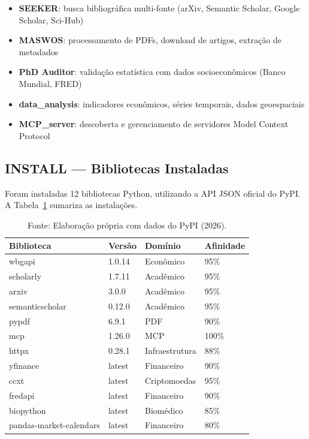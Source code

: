\documentclass[12pt,a4paper]{article}
\begin{document}
\begin{itemize}[itemsep=2pt]
  \item \textbf{SEEKER}: busca bibliográfica multi-fonte (arXiv, Semantic Scholar, Google Scholar, Sci-Hub)
  \item \textbf{MASWOS}: processamento de PDFs, download de artigos, extração de metadados
  \item \textbf{PhD Auditor}: validação estatística com dados socioeconômicos (Banco Mundial, FRED)
  \item \textbf{data\_analysis}: indicadores econômicos, séries temporais, dados geoespaciais
  \item \textbf{MCP\_server}: descoberta e gerenciamento de servidores Model Context Protocol
\end{itemize}

\subsection{INSTALL --- Bibliotecas Instaladas}

Foram instaladas 12 bibliotecas Python, utilizando a API JSON oficial do PyPI. A Tabela~\ref{tab:installed} sumariza as instalações.

\begin{table}[H]
  \centering
  \caption{Bibliotecas instaladas pelo pipeline /evolve (Rounds 8--9)}
  \label{tab:installed}
  \begin{tabular}{l l l l}
    \toprule
    \textbf{Biblioteca} & \textbf{Versão} & \textbf{Domínio} & \textbf{Afinidade} \\
    \midrule
    wbgapi          & 1.0.14   & Econômico       & 95\% \\
    scholarly       & 1.7.11   & Acadêmico       & 95\% \\
    arxiv           & 3.0.0    & Acadêmico       & 95\% \\
    semanticscholar & 0.12.0   & Acadêmico       & 95\% \\
    pypdf           & 6.9.1    & PDF             & 90\% \\
    mcp             & 1.26.0   & MCP             & 100\% \\
    httpx           & 0.28.1   & Infraestrutura  & 88\% \\
    yfinance        & latest   & Financeiro      & 90\% \\
    ccxt            & latest   & Criptomoedas    & 95\% \\
    fredapi         & latest   & Financeiro      & 90\% \\
    biopython       & latest   & Biomédico       & 85\% \\
    pandas-market-calendars & latest & Financeiro & 80\% \\
    \bottomrule
  \end{tabular}
  \caption*{\footnotesize Fonte: Elaboração própria com dados do PyPI (2026).}
\end{table}
\end{document}
